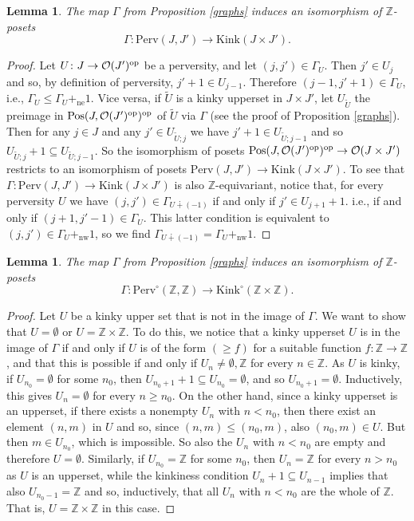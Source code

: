 \documentclass{article}
\newtheorem{lem}[thm]{Lemma}
\theoremstyle{definition}
\newcommand{\Z}{\mathbb{Z}}
\newcommand{\Oo}{\mathcal{O}}
\newcommand{\pos}{\textnormal{Pos}}
\newcommand{\op}{\textnormal{op}}
\newcommand{\gr}{\Gamma}
\begin{document}
\begin{lem}
 The map $\Gamma$ from Proposition \ref{graphs} induces an isomorphism of $\Z$-posets
  \[
 \gr \colon \mathrm{Perv}(J,J')\to \mathrm{Kink}(J\times J').
  \]
\end{lem}
\begin{proof}
Let $U\colon J\to \Oo(J')^\op$ be a perversity, and let $(j,j')\in \Gamma_U$. Then $j'\in U_{j}$ and so, by definition of perversity, $j'+1\in U_{j-1}$. Therefore $(j-1,j'+1)\in \Gamma_U$, i.e., $\Gamma_U\leq \Gamma_U+_{\mathrm{ne}} 1$. Vice versa, if $\tilde{U}$ is a kinky upperset in $J\times J'$, let $U_{\tilde{U}}$ the preimage in $\pos(J,\Oo(J')^\op)^\op$ of $\tilde{U}$ via $\Gamma$ (see the proof of Proposition \ref{graphs}). Then for any $j\in J$ and any $j'\in U_{\tilde{U};j}$ we have $j'+1\in U_{\tilde{U};j-1}$ and so $U_{\tilde{U};j}+1\subseteq U_{\tilde{U};j-1}$. So the isomorphism of posets $\pos(J,\Oo(J')^\op)^\op\to \Oo(J \times J')$ restricts to an isomorphism of posets $\mathrm{Perv}(J,J')\to \mathrm{Kink}(J\times J')$. To see that $ \gr \colon \mathrm{Perv}(J,J')\to \mathrm{Kink}(J\times J')$ is also $\Z$-equivariant, notice that, for every perversity $U$ we have $(j,j')\in \Gamma_{U\dotplus (-1)}$ if and only if $j'\in U_{j+1}+1$. i.e., if and only if $(j+1,j'-1)\in \Gamma_U$. This latter condition is equivalent to $(j,j')\in \Gamma_U+_{\mathrm{nw}}1$, so we find $\Gamma_{U\dotplus (-1)}=\Gamma_U+_{\mathrm{nw}}1$.
\end{proof}



\begin{lem}
The map $\Gamma$ from Proposition \ref{graphs} induces an isomorphism of $\Z$-posets
  \[
 \gr \colon \mathrm{Perv}^\circ(\Z,\Z)\to \mathrm{Kink}^\circ(\Z\times \Z).
  \]
\end{lem}
\begin{proof}
{\color{red}Let $U$ be a kinky upper set that is not in the image of $\Gamma$. We want to show that $U=\emptyset$ or $U=\Z\times \Z$. To do this, we notice that}
a kinky upperset $U$ is in the image of $\Gamma$ if and only if $U$ is of the form $(\geq f)$ for a suitable function $f\colon \Z\to \Z$, {\color{red}and that} this is possible if and only if $U_n\neq \emptyset,\Z$ for every $n\in \Z$.  As $U$ is kinky, if $U_{n_0}=\emptyset$ for some $n_0$, then $U_{n_0+1}+1\subseteq U_{n_0}=\emptyset$, and so $U_{n_0+1}=\emptyset$. Inductively, this gives $U_n=\emptyset$ for every $n\geq n_0$.  On the other hand, since a kinky upperset is an upperset, if there exists a nonempty $U_n$ with $n<n_0$, then there exist an element $(n,m)$ in $U$ and so, since $(n,m)\leq (n_0,m)$, also $ (n_0,m)\in U$. But then $m\in U_{n_0}$, which is impossible. So also the $U_n$ with $n<n_0$ are empty and therefore $U=\emptyset$. Similarly, if $U_{n_0}=\Z$ for some $n_0$, then $U_n=\Z$ for every $n>n_0$ as $U$ is an upperset, while the kinkiness condition $U_{n}+1\subseteq U_{n-1}$ implies that also $U_{n_0-1}=\Z$ and so, inductively, that all $U_n$ with $n<n_0$ are the whole of $\Z$. That is, $U=\Z\times\Z$ in this case. 
\end{proof}
\end{document}
